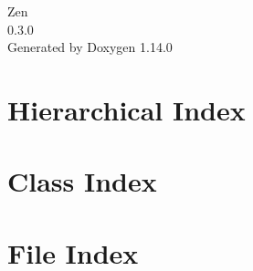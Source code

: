 \documentclass[twoside]{book}
\newcommand{\+}{\discretionary{\mbox{\scriptsize$\hookleftarrow$}}{}{}}
\newcommand{\clearemptydoublepage}{%
    \newpage{\pagestyle{empty}\cleardoublepage}%
  }
\begin{document}
  \raggedbottom
    \hypersetup{pageanchor=false,
                bookmarksnumbered=true,
                pdfencoding=unicode
               }
  \begin{titlepage}
  \vspace*{7cm}
  \begin{center}%
  {\Large Zen}\\
  [1ex]\large 0.\+3.\+0 \\
  \vspace*{1cm}
  {\large Generated by Doxygen 1.14.0}\\
  \end{center}
  \end{titlepage}
  \clearemptydoublepage
  \tableofcontents
  \clearemptydoublepage
  \hypersetup{pageanchor=true}
\chapter{Hierarchical Index}

\chapter{Class Index}

\chapter{File Index}

\end{document}

